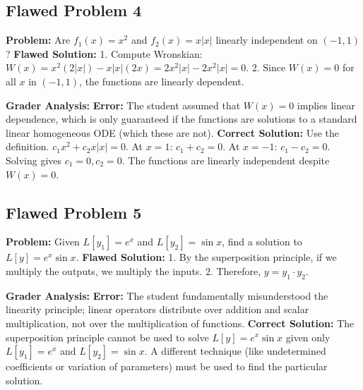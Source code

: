 \documentclass[11pt,letterpaper]{article}
\begin{document}
\subsection{Flawed Problem 4}
\textbf{Problem:} Are $f_1(x) = x^2$ and $f_2(x) = x|x|$ linearly independent on $(-1, 1)$?
\textbf{Flawed Solution:}
1. Compute Wronskian: $W(x) = x^2(2|x|) - x|x|(2x) = 2x^2|x| - 2x^2|x| = 0$.
2. Since $W(x) = 0$ for all $x$ in $(-1, 1)$, the functions are linearly dependent.

\textbf{Grader Analysis:}
\textbf{Error:} The student assumed that $W(x) = 0$ implies linear dependence, which is only guaranteed if the functions are solutions to a standard linear homogeneous ODE (which these are not).
\textbf{Correct Solution:} Use the definition. $c_1 x^2 + c_2 x|x| = 0$. At $x=1$: $c_1 + c_2 = 0$. At $x=-1$: $c_1 - c_2 = 0$. Solving gives $c_1=0, c_2=0$. The functions are linearly independent despite $W(x)=0$.

\subsection{Flawed Problem 5}
\textbf{Problem:} Given $L[y_1] = e^x$ and $L[y_2] = \sin x$, find a solution to $L[y] = e^x \sin x$.
\textbf{Flawed Solution:}
1. By the superposition principle, if we multiply the outputs, we multiply the inputs.
2. Therefore, $y = y_1 \cdot y_2$.

\textbf{Grader Analysis:}
\textbf{Error:} The student fundamentally misunderstood the linearity principle; linear operators distribute over addition and scalar multiplication, not over the multiplication of functions.
\textbf{Correct Solution:} The superposition principle cannot be used to solve $L[y] = e^x \sin x$ given only $L[y_1] = e^x$ and $L[y_2] = \sin x$. A different technique (like undetermined coefficients or variation of parameters) must be used to find the particular solution.
\end{document}
